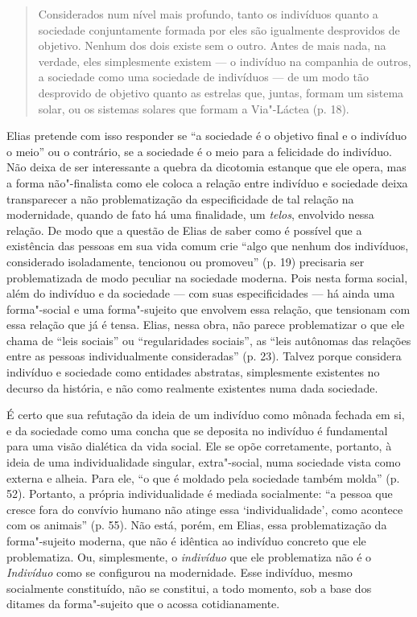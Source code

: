 \begin{quote}
Considerados num nível mais profundo, tanto os indivíduos quanto a
sociedade conjuntamente formada por eles são igualmente desprovidos de
objetivo. Nenhum dos dois existe sem o outro. Antes de mais nada, na
verdade, eles simplesmente existem --- o indivíduo na companhia de
outros, a sociedade como uma sociedade de indivíduos --- de um modo tão
desprovido de objetivo quanto as estrelas que, juntas, formam um sistema
solar, ou os sistemas solares que formam a Via"-Láctea (p. 18).
\end{quote}

Elias pretende com isso responder se ``a sociedade é o objetivo final e
o indivíduo o meio'' ou o contrário, se a sociedade é o meio para a
felicidade do indivíduo. Não deixa de ser interessante a quebra da
dicotomia estanque que ele opera, mas a forma não"-finalista como ele
coloca a relação entre indivíduo e sociedade deixa transparecer a não
problematização da especificidade de tal relação na modernidade, quando
de fato há uma finalidade, um \emph{telos}, envolvido nessa relação. De
modo que a questão de Elias de saber como é possível que a existência
das pessoas em sua vida comum crie ``algo que nenhum dos indivíduos,
considerado isoladamente, tencionou ou promoveu'' (p. 19) precisaria ser
problematizada de modo peculiar na sociedade moderna. Pois nesta forma
social, além do indivíduo e da sociedade --- com suas especificidades ---
há ainda uma forma"-social e uma forma"-sujeito que envolvem essa relação,
que tensionam com essa relação que já é tensa. Elias, nessa obra, não
parece problematizar o que ele chama de ``leis sociais'' ou
``regularidades sociais'', as ``leis autônomas das relações entre as
pessoas individualmente consideradas'' (p. 23). Talvez porque considera
indivíduo e sociedade como entidades abstratas, simplesmente existentes
no decurso da história, e não como realmente existentes numa dada
sociedade.

É certo que sua refutação da ideia de um indivíduo como mônada fechada
em si, e da sociedade como uma concha que se deposita no indivíduo é
fundamental para uma visão dialética da vida social. Ele se opõe
corretamente, portanto, à ideia de uma individualidade singular,
extra"-social, numa sociedade vista como externa e alheia. Para ele, ``o
que é moldado pela sociedade também molda'' (p. 52). Portanto, a própria
individualidade é mediada socialmente: ``a pessoa que cresce fora do
convívio humano não atinge essa `individualidade', como acontece com os
animais'' (p. 55). Não está, porém, em Elias, essa problematização da
forma"-sujeito moderna, que não é idêntica ao indivíduo concreto que ele
problematiza. Ou, simplesmente, o \emph{indivíduo} que ele problematiza
não é o \emph{Indivíduo} como se configurou na modernidade. Esse
indivíduo, mesmo socialmente constituído, não se constitui, a todo
momento, sob a base dos ditames da forma"-sujeito que o acossa
cotidianamente.

